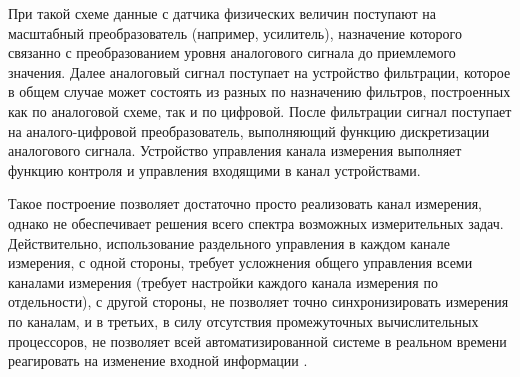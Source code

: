 \documentclass[a4paper, 14pt, titlepage]{extarticle}
\newenvironment{myfigure}[2]%
    {\pushQED{\caption{#1} \label{#2}} %
     \begin{figure}[!htb]\centering } %
    {  \popQED %
     \end{figure}}
\begin{document}
  \begin{myfigure}{функциональная схема канала измерения}{fig:channel-scheme}
  \end{myfigure}

  При такой схеме данные с датчика физических величин поступают на масштабный преобразователь (например, усилитель),
  назначение которого связанно с преобразованием уровня аналогового сигнала до приемлемого значения.
  Далее аналоговый сигнал поступает на устройство фильтрации, которое в общем случае может состоять
  из разных по назначению фильтров, построенных как по аналоговой схеме, так и по цифровой. После
  фильтрации сигнал поступает на аналого-цифровой преобразователь, выполняющий
  функцию дискретизации аналогового сигнала. Устройство управления канала измерения
  выполняет функцию контроля и управления входящими в канал устройствами.

  Такое построение позволяет
  достаточно просто реализовать канал измерения, однако не обеспечивает решения всего спектра
  возможных измерительных задач. Действительно, использование раздельного управления в каждом канале
  измерения, с одной стороны, требует усложнения общего управления всеми каналами измерения (требует
  настройки каждого канала измерения по отдельности), с другой стороны, не позволяет точно
  синхронизировать измерения по каналам, и в третьих, в силу отсутствия промежуточных вычислительных
  процессоров, не позволяет всей автоматизированной системе в реальном времени реагировать на
  изменение входной информации \cite{stupin-methods}.
\end{document}
